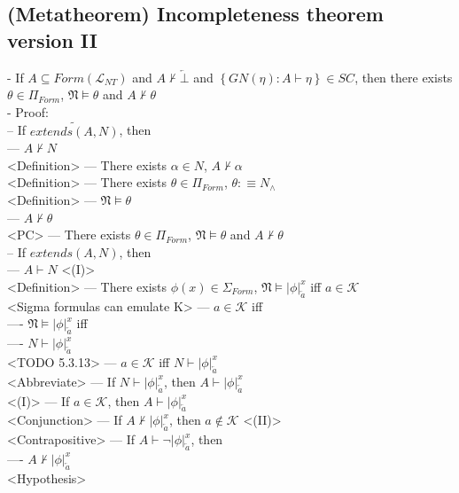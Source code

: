 \documentclass{book}
\newcommand{\is}{:\equiv}
\newcommand{\pnot}[1]{\widetilde{#1}}
\newcommand{\inot}{\not}
\newcommand{\contr}{\overleftarrow{\bot}}
\newcommand{\set}[1]{\left\{ #1 \right\}}
\newcommand{\sub}[3]{\left|#1\right|_{#3}^{#2}}
\begin{document}
\subsection{(Metatheorem) Incompleteness theorem version II} %
	- If $A \subseteq Form(\mathcal{L}_{NT})$ and $A \inot \vdash \contr$ and $\set{GN(\eta): A \vdash \eta} \in SC$, then there exists $\theta \in \Pi_{Form}$, $\mathfrak{N} \vDash \theta$ and $A \inot \vdash \theta$ \\
	- Proof: \\
		-- If $\pnot{extends(A, N)}$, then \\
			--- $A \inot \vdash N$ \\ <Definition>
			--- There exists $\alpha \in N$, $A \inot \vdash \alpha$ \\ <Definition>
			--- There exists $\theta \in \Pi_{Form}$, $\theta \is N_{\land}$ \\ <Definition>
			--- $\mathfrak{N} \vDash \theta$ \\
			--- $A \inot \vdash \theta$ \\ <PC>	
			--- There exists $\theta \in \Pi_{Form}$, $\mathfrak{N} \vDash \theta$ and $A \inot \vdash \theta$ \\
		-- If $extends(A, N)$, then \\
			--- $A \vdash N$ <(I)> \\ <Definition>
			--- There exists $\phi(x) \in \Sigma_{Form}$, $\mathfrak{N} \vDash \sub{\phi}{x}{\overleftarrow{a}}$ iff $a \in \mathcal{K}$ \\ <Sigma formulas can emulate K>
			--- $a \in \mathcal{K}$ iff \\
				---- $\mathfrak{N} \vDash \sub{\phi}{x}{\overleftarrow{a}}$ iff \\
				---- $N \vdash \sub{\phi}{x}{\overleftarrow{a}}$ \\ <TODO 5.3.13>
			--- $a \in \mathcal{K}$ iff $N \vdash \sub{\phi}{x}{\overleftarrow{a}}$ \\ <Abbreviate>
			--- If $N \vdash \sub{\phi}{x}{\overleftarrow{a}}$, then $A \vdash \sub{\phi}{x}{\overleftarrow{a}}$ \\ <(I)>
			--- If $a \in \mathcal{K}$, then $A \vdash \sub{\phi}{x}{\overleftarrow{a}}$ \\ <Conjunction>
			--- If $A \inot \vdash \sub{\phi}{x}{\overleftarrow{a}}$, then $a \inot \in \mathcal{K}$ <(II)> \\ <Contrapositive>
			--- If $A \vdash \lnot \sub{\phi}{x}{\overleftarrow{a}}$, then \\
				---- $A \inot \vdash \sub{\phi}{x}{\overleftarrow{a}}$ \\ <Hypothesis>
\end{document}

